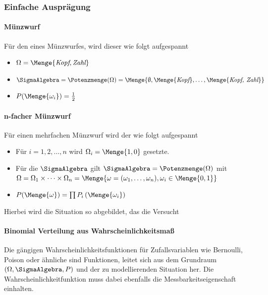 \subsubsection{Einfache Ausprägung}

\paragraph{Münzwurf}
Für den \WRaum eines Münzwurfes, wird dieser wie folgt aufgespannt

\begin{itemize}
	\item $\Omega = \Menge{\textit{Kopf}, \textit{Zahl}}$
	\item $\SigmaAlgebra = \Potenzmenge (\Omega) = \Menge{\emptyset,\Menge{\textit{Kopf}}, \dots, \Menge{\textit{Kopf, Zahl}}}$
	\item $P(\Menge{\omega_i}) = \frac{1}{2}$
\end{itemize}

\paragraph{n-facher Münzwurf}
Für einen mehrfachen Münzwurf wird der \WRaum wie folgt aufgespannt

\begin{itemize}
	\item Für $i=1,2,\dots, n$ wird $\Omega_i = \Menge{1, 0}$ gesetzte.
	\item Für die $\SigmaAlgebra$  gilt $\SigmaAlgebra=\Potenzmenge(\Omega)$ mit $\Omega=\Omega_1\times \dots \times \Omega_n = \Menge{\omega = (\omega_1, \dots, \omega_n), \omega_i\in\Menge{0,1}}$
	\item $P(\Menge{\omega}) =  \prod P_i \left(\Menge{\omega_i}\right)$
\end{itemize}

Hierbei wird die Situation so abgebildet, das die Versucht

\paragraph{Binomial Verteilung aus Wahrscheinlichkeitsmaß}
Die gängigen Wahrscheinlichkeitsfunktionen für Zufallsvariablen wie Bernoulli, Poison oder ähnliche sind Funktionen, leitet sich aus dem Grundraum $(\Omega, \SigmaAlgebra, P)$ und der zu modellierenden Situation her. Die Wahrscheinlichkeitfunktion muss dabei ebenfalls die Messbarkeitseigenschaft einhalten.

